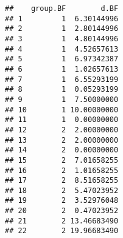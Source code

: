 \documentclass[
]{article}
\newenvironment{Shaded}{\begin{snugshade}}{\end{snugshade}}
\newcommand{\AttributeTok}[1]{\textcolor[rgb]{0.77,0.63,0.00}{#1}}
\newcommand{\CommentTok}[1]{\textcolor[rgb]{0.56,0.35,0.01}{\textit{#1}}}
\newcommand{\DecValTok}[1]{\textcolor[rgb]{0.00,0.00,0.81}{#1}}
\newcommand{\FunctionTok}[1]{\textcolor[rgb]{0.00,0.00,0.00}{#1}}
\newcommand{\NormalTok}[1]{#1}
\newcommand{\OtherTok}[1]{\textcolor[rgb]{0.56,0.35,0.01}{#1}}
\newcommand{\SpecialCharTok}[1]{\textcolor[rgb]{0.00,0.00,0.00}{#1}}
\begin{document}
\begin{Shaded}
\end{Shaded}

\begin{verbatim}
##    group.BF        d.BF
## 1         1  6.30144996
## 2         1  2.80144996
## 3         1  4.80144996
## 4         1  4.52657613
## 5         1  6.97342387
## 6         1  1.02657613
## 7         1  6.55293199
## 8         1  0.05293199
## 9         1  7.50000000
## 10        1 10.00000000
## 11        1  0.00000000
## 12        2  2.00000000
## 13        2  2.00000000
## 14        2  0.00000000
## 15        2  7.01658255
## 16        2  1.01658255
## 17        2  8.51658255
## 18        2  5.47023952
## 19        2  3.52976048
## 20        2  0.47023952
## 21        2 13.46683490
## 22        2 19.96683490
\end{verbatim}
\end{document}
